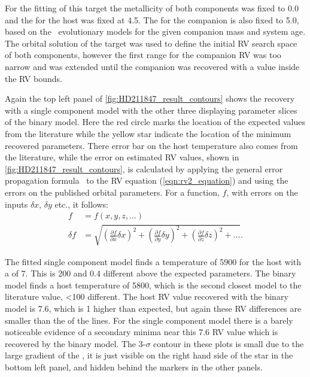For the fitting of this target the metallicity of both components was fixed to 0.0 and the \Logg{} for the host was fixed at 4.5.
The \Logg{} for the companion is also fixed to 5.0, based on the~\citet{baraffe_new_2015} evolutionary models for the given companion mass and system age.
The orbital solution of the target was used to define the initial {RV} search space of both components, however the first range for the companion {RV} was too narrow and was extended until the companion was recovered with a value inside the {RV} bounds.

Again the top left panel of \cref{fig:HD211847_result_contours} shows the recovery with a single component model with the other three displaying parameter slices of the binary model.
Here the red circle marks the location of the expected values from the literature while the yellow star indicate the location of the minimum \textchisquared{} recovered parameters.
There error bar on the host temperature also comes from the literature, while the error on estimated {RV} values, shown in \cref{fig:HD211847_result_contours}, is calculated by applying the general error propagation formula~\citep{ku_notes_1966} to the {RV} equation (\cref{eqn:rv2_equation}) and using the errors on the published orbital parameters.
For a function, \(f\), with errors on the inputs \(\delta x\), \(\delta y\) etc., it follows:
\begin{align}
f &= f(x, y, z, \ldots)\\
\delta f &= \sqrt{{\left( \frac{\partial f}{\partial x} \delta x\right)}^2 + {\left(\frac{\partial f}{\partial y} \delta y\right)}^2 + {\left(\frac{\partial f}{\partial z} \delta z\right)}^2 + \ldots}.
\end{align}

The fitted single component model finds a temperature of 5900\K{} for the host with a \Rvone{} of 7\kmps{}.
This is 200\K{} and 0.4\kmps{} different above the expected parameters.
The binary model finds a host temperature of 5800\K{}, which is the second closest model to the literature value, <100\K{} different.
The host {RV} value recovered with the binary model is 7.6\kmps{}, which is 1\kmps{} higher than expected, but again these {RV} differences are smaller than the {\fwhm} of the lines.
For the single component model there is a barely noticeable evidence of a secondary minima near this 7.6\kmps{} {RV} value which is recovered by the binary model.
The 3-\(\sigma\) contour in these plots is small due to the large gradient of the \textchisquared{}, it is just visible on the right hand side of the star in the bottom left panel, and hidden behind the markers in the other panels.

